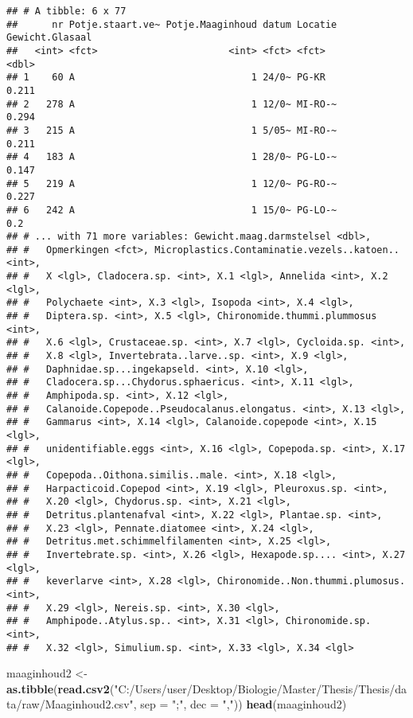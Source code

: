 \documentclass[]{article}
\newenvironment{Shaded}{\begin{snugshade}}{\end{snugshade}}
\newcommand{\KeywordTok}[1]{\textcolor[rgb]{0.13,0.29,0.53}{\textbf{#1}}}
\newcommand{\DataTypeTok}[1]{\textcolor[rgb]{0.13,0.29,0.53}{#1}}
\newcommand{\StringTok}[1]{\textcolor[rgb]{0.31,0.60,0.02}{#1}}
\newcommand{\NormalTok}[1]{#1}
\begin{document}
\begin{verbatim}
## # A tibble: 6 x 77
##      nr Potje.staart.ve~ Potje.Maaginhoud datum Locatie Gewicht.Glasaal
##   <int> <fct>                       <int> <fct> <fct>             <dbl>
## 1    60 A                               1 24/0~ PG-KR             0.211
## 2   278 A                               1 12/0~ MI-RO-~           0.294
## 3   215 A                               1 5/05~ MI-RO-~           0.211
## 4   183 A                               1 28/0~ PG-LO-~           0.147
## 5   219 A                               1 12/0~ PG-RO-~           0.227
## 6   242 A                               1 15/0~ PG-LO-~           0.2  
## # ... with 71 more variables: Gewicht.maag.darmstelsel <dbl>,
## #   Opmerkingen <fct>, Microplastics.Contaminatie.vezels..katoen.. <int>,
## #   X <lgl>, Cladocera.sp. <int>, X.1 <lgl>, Annelida <int>, X.2 <lgl>,
## #   Polychaete <int>, X.3 <lgl>, Isopoda <int>, X.4 <lgl>,
## #   Diptera.sp. <int>, X.5 <lgl>, Chironomide.thummi.plummosus <int>,
## #   X.6 <lgl>, Crustaceae.sp. <int>, X.7 <lgl>, Cycloida.sp. <int>,
## #   X.8 <lgl>, Invertebrata..larve..sp. <int>, X.9 <lgl>,
## #   Daphnidae.sp...ingekapseld. <int>, X.10 <lgl>,
## #   Cladocera.sp...Chydorus.sphaericus. <int>, X.11 <lgl>,
## #   Amphipoda.sp. <int>, X.12 <lgl>,
## #   Calanoide.Copepode..Pseudocalanus.elongatus. <int>, X.13 <lgl>,
## #   Gammarus <int>, X.14 <lgl>, Calanoide.copepode <int>, X.15 <lgl>,
## #   unidentifiable.eggs <int>, X.16 <lgl>, Copepoda.sp. <int>, X.17 <lgl>,
## #   Copepoda..Oithona.similis..male. <int>, X.18 <lgl>,
## #   Harpacticoid.Copepod <int>, X.19 <lgl>, Pleuroxus.sp. <int>,
## #   X.20 <lgl>, Chydorus.sp. <int>, X.21 <lgl>,
## #   Detritus.plantenafval <int>, X.22 <lgl>, Plantae.sp. <int>,
## #   X.23 <lgl>, Pennate.diatomee <int>, X.24 <lgl>,
## #   Detritus.met.schimmelfilamenten <int>, X.25 <lgl>,
## #   Invertebrate.sp. <int>, X.26 <lgl>, Hexapode.sp.... <int>, X.27 <lgl>,
## #   keverlarve <int>, X.28 <lgl>, Chironomide..Non.thummi.plumosus. <int>,
## #   X.29 <lgl>, Nereis.sp. <int>, X.30 <lgl>,
## #   Amphipode..Atylus.sp.. <int>, X.31 <lgl>, Chironomide.sp. <int>,
## #   X.32 <lgl>, Simulium.sp. <int>, X.33 <lgl>, X.34 <lgl>
\end{verbatim}

\begin{Shaded}
\begin{Highlighting}[]
\NormalTok{maaginhoud2 <-}\StringTok{ }\KeywordTok{as.tibble}\NormalTok{(}\KeywordTok{read.csv2}\NormalTok{(}\StringTok{"C:/Users/user/Desktop/Biologie/Master/Thesis/Thesis/data/raw/Maaginhoud2.csv"}\NormalTok{, }\DataTypeTok{sep =} \StringTok{";"}\NormalTok{, }\DataTypeTok{dec =} \StringTok{","}\NormalTok{))}
\KeywordTok{head}\NormalTok{(maaginhoud2)}
\end{Highlighting}
\end{Shaded}
\end{document}
